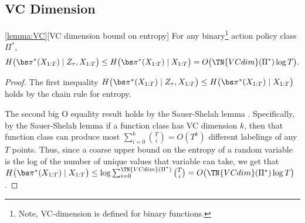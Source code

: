\subsection{VC Dimension}
\label{app:VCdim}

\begin{customlemma}{\ref{lemma:VC}}[VC dimension bound on entropy]
    For any binary\footnote{Note, VC-dimension is defined for binary functions.} action policy class $\Pi^*$, 
    \begin{align*}
        H \big( \piX \mid Z_{\tau}, X_{1:T} \big)
        \leq H \big( \piX \mid X_{1:T} \big)
        = O\big( \TN{VCdim}(\Pi^*) \log T \big).
    \end{align*}
\end{customlemma}

\begin{proof}
The first inequality $H \big( \piX \mid Z_{\tau}, X_{1:T} \big) \leq H \big( \piX \mid X_{1:T} \big)$ holds by the chain rule for entropy.

The second big O equality result holds by the Sauer-Shelah lemma \citep{sauer1972density,shelah1972combinatorial}. Specifically, by the Sauer-Shelah lemma if a function class has VC dimension $k$, then that function class can produce most $\sum_{i=0}^k {T\choose i} = O(T^{k})$ different labelings of any $T$ points. Thus, since a coarse upper bound on the entropy of a random variable is the log of the number of unique values that variable can take, we get that $H \big( \piX \mid X_{1:T} \big) \leq \log \sum_{i=0}^{\TN{VCdim}(\Pi^*)} {T\choose i} = O\big( \TN{VCdim}(\Pi^*) \log T \big)$.
\end{proof}


